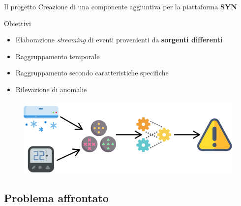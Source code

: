 \documentclass{beamer}
\begin{document}
	\begin{frame}{Il progetto}
	\vspace{.5em}
		Creazione di una componente aggiuntiva per la piattaforma \textbf{SYN} \vspace{.2em}
		
		\begin{block}{Obiettivi}
			\begin{itemize}
				\item Elaborazione \textit{streaming} di eventi provenienti da \textbf{sorgenti differenti} \vspace{.5em}
				\item Raggruppamento temporale \vspace{.5em}
				\item Raggruppamento secondo caratteristiche specifiche \vspace{.5em}
				\item Rilevazione di anomalie \vspace{.5em} 			
			\end{itemize}
		\end{block}
		
		\vspace{-0.3cm}
		\begin{figure}[!h] 
    		\centering 
    		\includegraphics[width=0.55\columnwidth]{../immagini/slide/elaboration_example.png}
		\end{figure}
		
	\end{frame}
	
	\subsection{Problema affrontato}
\end{document}
